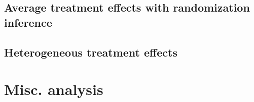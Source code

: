 \documentclass[11pt]{article}
\begin{document}
        
        
        
        
        
        
        
        

    \clearpage

    \subsection{Average treatment effects with randomization inference}

        
        
        
        
        
        
        
        
        

    \clearpage

	\subsection{Heterogeneous treatment effects}

		
		
		
		
		
		
		
		
		
		
		
		
		
		
		
		
		
		
		
		
		

	\clearpage

\section{Misc. analysis}
\end{document}
